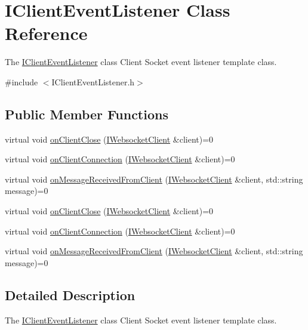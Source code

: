 \hypertarget{class_i_client_event_listener}{\section{I\-Client\-Event\-Listener Class Reference}
\label{class_i_client_event_listener}
}


The \hyperlink{class_i_client_event_listener}{I\-Client\-Event\-Listener} class Client Socket event listener template class.  




{\ttfamily \#include $<$I\-Client\-Event\-Listener.\-h$>$}

\subsection*{Public Member Functions}
\begin{DoxyCompactItemize}
\item 
virtual void \hyperlink{class_i_client_event_listener_ad361206cbbc2f53df38d41b00c088734}{on\-Client\-Close} (\hyperlink{class_i_websocket_client}{I\-Websocket\-Client} \&client)=0
\item 
virtual void \hyperlink{class_i_client_event_listener_ab224b5ffe68d956417da32661feb9f93}{on\-Client\-Connection} (\hyperlink{class_i_websocket_client}{I\-Websocket\-Client} \&client)=0
\item 
virtual void \hyperlink{class_i_client_event_listener_a69cdb3e0149213614301de11305e71a1}{on\-Message\-Received\-From\-Client} (\hyperlink{class_i_websocket_client}{I\-Websocket\-Client} \&client, std\-::string message)=0
\item 
virtual void \hyperlink{class_i_client_event_listener_ad361206cbbc2f53df38d41b00c088734}{on\-Client\-Close} (\hyperlink{class_i_websocket_client}{I\-Websocket\-Client} \&client)=0
\item 
virtual void \hyperlink{class_i_client_event_listener_ab224b5ffe68d956417da32661feb9f93}{on\-Client\-Connection} (\hyperlink{class_i_websocket_client}{I\-Websocket\-Client} \&client)=0
\item 
virtual void \hyperlink{class_i_client_event_listener_a69cdb3e0149213614301de11305e71a1}{on\-Message\-Received\-From\-Client} (\hyperlink{class_i_websocket_client}{I\-Websocket\-Client} \&client, std\-::string message)=0
\end{DoxyCompactItemize}


\subsection{Detailed Description}
The \hyperlink{class_i_client_event_listener}{I\-Client\-Event\-Listener} class Client Socket event listener template class. 

